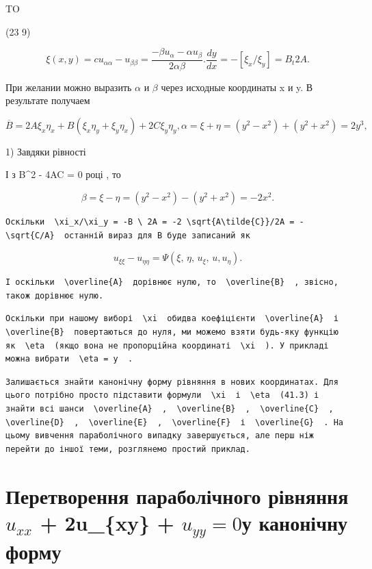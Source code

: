 \documentclass[
  ukrainian,
]{article}
\begin{document}
TO

(23 9)

\[
\xi(x, y) = c
u_{\alpha\alpha} - u_{\beta\beta} = \frac{-\beta u_{\alpha} - \alpha u_{\beta}}{2\alpha\beta}.
\frac{dy}{dx} = -\left[\xi_x/\xi_y\right] = B_t 2A.
\]

При желании можно выразить \(\alpha\) и \(\beta\) через исходные
координаты x и y. В результате получаем

\[
\overline{B} = 2A\xi_x\eta_x + B(\xi_x\eta_y + \xi_y\eta_x) + 2C\xi_y\eta_y,
\alpha = \xi + \eta = (y^2 - x^2) + (y^2 + x^2) = 2y^3,
\]

1) Завдяки рівності

І з B\^{}2 - 4AC = 0 році , то

\[
\beta = \xi - \eta = (y^2 - x^2) - (y^2 + x^2) = -2x^2.
\]

\begin{verbatim}
Оскільки  \xi_x/\xi_y = -B \ 2A = -2 \sqrt{A\tilde{C}}/2A = -\sqrt{C/A}  останній вираз для B буде записаний як
\end{verbatim}

\[
u_{\xi\xi} - u_{\eta\eta} = \Psi(\xi, \, \eta, \, u_{\xi}, \, u, u_{\eta}).
\]

\begin{verbatim}
І оскільки  \overline{A}  дорівнює нулю, то  \overline{B}  , звісно, також дорівнює нулю.
\end{verbatim}

\begin{verbatim}
Оскільки при нашому виборі  \xi  обидва коефіцієнти  \overline{A}  і  \overline{B}  повертаються до нуля, ми можемо взяти будь-яку функцію як  \eta  (якщо вона не пропорційна координаті  \xi  ). У прикладі можна вибрати  \eta = y  .
\end{verbatim}

\begin{verbatim}
Залишається знайти канонічну форму рівняння в нових координатах. Для цього потрібно просто підставити формули  \xi  і  \eta  (41.3) і знайти всі шанси  \overline{A}  ,  \overline{B}  ,  \overline{C}  ,  \overline{D}  ,  \overline{E}  ,  \overline{F}  і  \overline{G}  . На цьому вивчення параболічного випадку завершується, але перш ніж перейти до іншої теми, розглянемо простий приклад.
\end{verbatim}

\section{\texorpdfstring{Перетворення параболічного рівняння \(u_{xx}\)
+ 2u\_\{xy\} + \(u_{yy} = 0\)у канонічну
форму}{Перетворення параболічного рівняння u\_\{xx\} + 2u\_\{xy\} + u\_\{yy\} = 0у канонічну форму}}\label{ux43fux435ux440ux435ux442ux432ux43eux440ux435ux43dux43dux44f-ux43fux430ux440ux430ux431ux43eux43bux456ux447ux43dux43eux433ux43e-ux440ux456ux432ux43dux44fux43dux43dux44f-u_xx-2u_xy-u_yy-0ux443-ux43aux430ux43dux43eux43dux456ux447ux43dux443-ux444ux43eux440ux43cux443}
\end{document}
